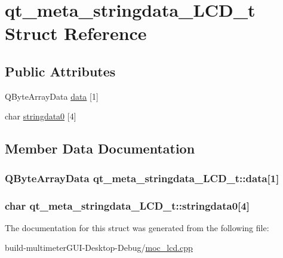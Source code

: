 \hypertarget{structqt__meta__stringdata___l_c_d__t}{\section{qt\-\_\-meta\-\_\-stringdata\-\_\-\-L\-C\-D\-\_\-t Struct Reference}
\label{structqt__meta__stringdata___l_c_d__t}
}
\subsection*{Public Attributes}
\begin{DoxyCompactItemize}
\item 
Q\-Byte\-Array\-Data \hyperlink{structqt__meta__stringdata___l_c_d__t_a1621b050dceea935634b98cd01f55a2c}{data} \mbox{[}1\mbox{]}
\item 
char \hyperlink{structqt__meta__stringdata___l_c_d__t_a780a8ccd8a376f8f8bfebc0404a8c202}{stringdata0} \mbox{[}4\mbox{]}
\end{DoxyCompactItemize}


\subsection{Member Data Documentation}
\hypertarget{structqt__meta__stringdata___l_c_d__t_a1621b050dceea935634b98cd01f55a2c}{
\subsubsection[{data}]{\setlength{\rightskip}{0pt plus 5cm}Q\-Byte\-Array\-Data qt\-\_\-meta\-\_\-stringdata\-\_\-\-L\-C\-D\-\_\-t\-::data\mbox{[}1\mbox{]}}}\label{structqt__meta__stringdata___l_c_d__t_a1621b050dceea935634b98cd01f55a2c}
\hypertarget{structqt__meta__stringdata___l_c_d__t_a780a8ccd8a376f8f8bfebc0404a8c202}{
\subsubsection[{stringdata0}]{\setlength{\rightskip}{0pt plus 5cm}char qt\-\_\-meta\-\_\-stringdata\-\_\-\-L\-C\-D\-\_\-t\-::stringdata0\mbox{[}4\mbox{]}}}\label{structqt__meta__stringdata___l_c_d__t_a780a8ccd8a376f8f8bfebc0404a8c202}


The documentation for this struct was generated from the following file\-:\begin{DoxyCompactItemize}
\item 
build-\/multimeter\-G\-U\-I-\/\-Desktop-\/\-Debug/\hyperlink{moc__lcd_8cpp}{moc\-\_\-lcd.\-cpp}\end{DoxyCompactItemize}
